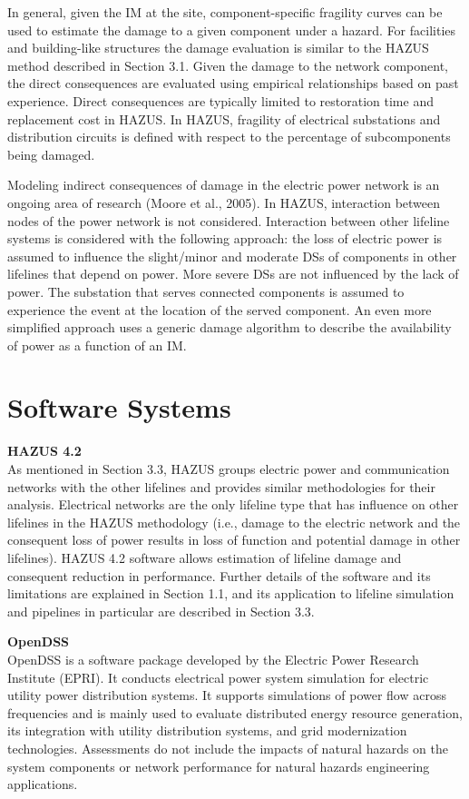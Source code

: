 In general, given the IM at the site, component-specific fragility curves can be used to estimate the damage to a given component under a hazard. For facilities and building-like structures the damage evaluation is similar to the HAZUS method described in Section 3.1. Given the damage to the network component, the direct consequences are evaluated using empirical relationships based on past experience. Direct consequences are typically limited to restoration time and replacement cost in HAZUS. In HAZUS, fragility of electrical substations and distribution circuits is defined with respect to the percentage of subcomponents being damaged.

Modeling indirect consequences of damage in the electric power network is an ongoing area of research (Moore et al., 2005). In HAZUS, interaction between nodes of the power network is not considered. Interaction between other lifeline systems is considered with the following approach: the loss of electric power is assumed to influence the slight/minor and moderate DSs of components in other lifelines that depend on power. More severe DSs are not influenced by the lack of power. The substation that serves connected components is assumed to experience the event at the location of the served component. An even more simplified approach uses a generic damage algorithm to describe the availability of power as a function of an IM. 

\section{Software Systems}
\label{sec:perf_power_tools}

\noindent\textbf{HAZUS 4.2} \\As mentioned in Section 3.3, HAZUS groups electric power and communication networks with the other lifelines and provides similar methodologies for their analysis. Electrical networks are the only lifeline type that has influence on other lifelines in the HAZUS methodology (i.e., damage to the electric network and the consequent loss of power results in loss of function and potential damage in other lifelines). HAZUS 4.2 software allows estimation of lifeline damage and consequent reduction in performance. Further details of the software and its limitations are explained in Section 1.1, and its application to lifeline simulation and pipelines in particular are described in Section 3.3.
\newline

\noindent\textbf{OpenDSS} \\OpenDSS is a software package developed by the Electric Power Research Institute (EPRI). It conducts electrical power system simulation for electric utility power distribution systems. It supports simulations of power flow across frequencies and is mainly used to evaluate distributed energy resource generation, its integration with utility distribution systems, and grid modernization technologies. Assessments do not include the impacts of natural hazards on the system components or network performance for natural hazards engineering applications.
\newline

